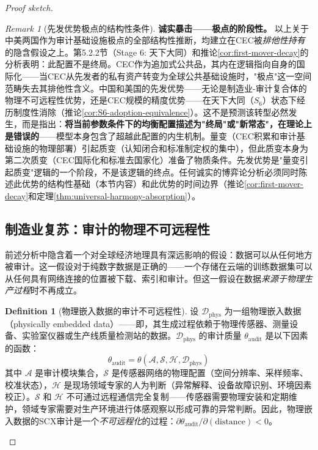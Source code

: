 \documentclass[12pt,a4paper]{ctexart}
\theoremstyle{definition}
\newtheorem{definition}{Definition}[section]
\theoremstyle{remark}
\newtheorem{remark}{Remark}[section]
\begin{document}
\begin{proof}[Proof sketch]
\begin{remark}[先发优势极点的结构性条件]
\textbf{诚实暴击——极点的阶段性。} 以上关于中美两国作为审计基础设施极点的全部结构性推断，均建立在CEC被\textit{排他性持有}的隐含假设之上。第5.2.2节（Stage 6: 天下大同）和推论\ref{cor:first-mover-decay}的分析表明：此配置不是终局。CEC作为追加式公共品，其内在逻辑指向自身的国际化——当CEC从先发者的私有资产转变为全球公共基础设施时，"极点"这一空间范畴失去其排他性含义。中国和美国的先发优势——无论是制造业-审计复合体的物理不可远程性优势，还是CEC规模的精度优势——在天下大同（$S_6$）状态下经历制度性消除（推论\ref{cor:S6-adoption-equivalence}）。这不是预测该转型必然发生，而是指出：\textbf{将当前参数条件下的均衡配置描述为"终局"或"新常态"，在理论上是错误的}——模型本身包含了超越此配置的内生机制。量变（CEC积累和审计基础设施的物理部署）引起质变（认知闭合和标准制定权的集中），但此质变本身为第二次质变（CEC国际化和标准去国家化）准备了物质条件。先发优势是"量变引起质变"逻辑的一个阶段，不是该逻辑的终点。任何诚实的博弈论分析必须同时陈述此优势的结构性基础（本节内容）和此优势的时间边界（推论\ref{cor:first-mover-decay}和定理\ref{thm:universal-harmony-absorption}）。
\end{remark}

\subsection{制造业复苏：审计的物理不可远程性}

前述分析中隐含着一个对全球经济地理具有深远影响的假设：数据可以从任何地方被审计。这一假设对于纯数字数据是正确的——一个存储在云端的训练数据集可以从任何具有网络连接的位置被下载、索引和审计。但这一假设在数据\textit{来源于物理生产过程}时不再成立。

\begin{definition}[物理嵌入数据的审计不可远程性]
设 $\mathcal{D}_{\text{phys}}$ 为一组物理嵌入数据（physically embedded data）——即，其生成过程依赖于物理传感器、测量设备、实验室仪器或生产线质量检测站的数据。$\mathcal{D}_{\text{phys}}$ 的审计质量 $\theta_{\text{audit}}$ 是以下因素的函数：
\begin{equation}
\theta_{\text{audit}} = \theta\left( \mathcal{A}, \mathcal{S}, \mathcal{H}, \mathcal{D}_{\text{phys}} \right)
\end{equation}
其中 $\mathcal{A}$ 是审计模块集合，$\mathcal{S}$ 是传感器网络的物理配置（空间分辨率、采样频率、校准状态），$\mathcal{H}$ 是现场领域专家的人为判断（异常解释、设备故障识别、环境因素校正）。$\mathcal{S}$ 和 $\mathcal{H}$ 不可通过远程通信完全复制——传感器需要物理安装和定期维护，领域专家需要对生产环境进行体感观察以形成可靠的异常判断。因此，物理嵌入数据的SCX审计是一个\textit{不可远程化}的过程：$\partial \theta_{\text{audit}} / \partial (\text{distance}) < 0$。
\end{definition}


\end{proof}
\end{document}
